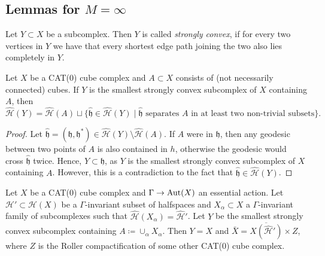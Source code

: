 \subsection{Lemmas for \(M = \infty\)}
\label{sec:M=infty}

\begin{defin}
  Let \(Y \subset X\) be a subcomplex. Then \(Y\) is called \emph{strongly convex}, if for every two vertices in \(Y\) we have that every shortest edge path joining the two also lies completely in \(Y\).
\end{defin}

\begin{lemma}[{\cite[Lemma~4.16]{MR3509968}}]
  \label{lem:4.16}
  Let \(X\) be a CAT(0) cube complex and \(A \subset X\) consists of (not necessarily connected) cubes. If \(Y\) is the smallest strongly convex subcomplex of \(X\) containing \(A\), then
  \[
    \mathcal{\hat H}(Y) = \mathcal{\hat H}(A) \sqcup \{\mathfrak{\hat h} \in \mathcal{\hat H}(Y) \mid \mathfrak{\hat h} \text{ separates } A \text{ in at least two non-trivial subsets}\}.
  \]
\end{lemma}

\begin{proof}
  Let \(\mathfrak{\hat h} = (\mathfrak{h}, \mathfrak{h}^\ast) \in \mathcal{\hat H}(Y) \setminus \mathcal{\hat H}(A)\). If \(A\) were in \(\mathfrak{h}\), then any geodesic between two points of \(A\) is also contained in \(h\), otherwise the geodesic would cross \(\mathfrak{\hat h}\) twice. Hence, \(Y \subset \mathfrak{h}\), as \(Y\) is the smallest strongly convex subcomplex of \(X\) containing \(A\). However, this is a contradiction to the fact that \(\mathfrak{\hat h} \in \mathcal{\hat H}(Y)\).
\end{proof}

\begin{prop}[{\cite[Proposition~4.17]{MR3509968}}]
  \label{prop:4.17}
  Let \(X\) be a CAT(0) cube complex and \(\Gamma \to \operatorname{Aut}(X)\) an essential action. Let \(\mathcal{H}' \subset \mathcal{H}(X)\) be a \(\Gamma\)-invariant subset of halfspaces and \(X_\alpha \subset X\) a \(\Gamma\)-invariant family of subcomplexes such that \(\mathcal{\hat H}(X_\alpha) = \mathcal{\hat H}'\). Let \(Y\) be the smallest strongly convex subcomplex containing \(A \coloneqq \cup_\alpha X_\alpha\). Then \(Y = X\) and \(\bar X = \overline{X(\mathcal{\hat H}')} \times Z\), where \(Z\) is the Roller compactification of some other CAT(0) cube complex.
\end{prop}

